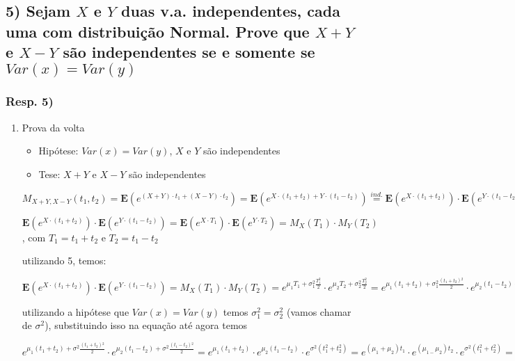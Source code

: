 \documentclass[english]{article}
\begin{document}
\subsection*{\textmd{5) Sejam $X$ e $Y$ duas v.a. independentes, cada uma com
distribuição Normal. Prove que $X+Y$ e $X-Y$ são independentes se
e somente se $Var(x)=Var(y)$}}


\subsubsection*{\textmd{Resp. 5) }}
\begin{enumerate}
\item Prova da volta

\begin{itemize}
\item Hipótese: $Var(x)=Var(y)$, $X$ e $Y$ são independentes
\item Tese: $X+Y$ e $X-Y$ são independentes
\end{itemize}

$M_{X+Y,X-Y}(t_{1},t_{2})=\mathbf{E}(e^{(X+Y)\cdot t_{1}+(X-Y)\cdot t_{2}})=\mathbf{E}(e^{X\cdot(t_{1}+t_{2})+Y\cdot(t_{1}-t_{2})})\overset{ind.}{=}\mathbf{E}(e^{X\cdot(t_{1}+t_{2})})\cdot\mathbf{E}(e^{Y\cdot(t_{1}-t_{2})})$


$\mathbf{E}(e^{X\cdot(t_{1}+t_{2})})\cdot\mathbf{E}(e^{Y\cdot(t_{1}-t_{2})})=\mathbf{E}(e^{X\cdot T_{1}})\cdot\mathbf{E}(e^{Y\cdot T_{2}})=M_{X}(T_{1})\cdot M_{Y}(T_{2})$,
com $T_{1}=t_{1}+t_{2}$ e $T_{2}=t_{1}-t_{2}$


utilizando 5, temos:


$\mathbf{E}(e^{X\cdot(t_{1}+t_{2})})\cdot\mathbf{E}(e^{Y\cdot(t_{1}-t_{2})})=M_{X}(T_{1})\cdot M_{Y}(T_{2})=e^{\mu_{1}T_{1}+\sigma_{1}^{2}\frac{T_{1}^{2}}{2}}\cdot e^{\mu_{2}T_{2}+\sigma_{2}^{2}\frac{T_{2}^{2}}{2}}=e^{\mu_{1}(t_{1}+t_{2})+\sigma_{1}^{2}\frac{(t_{1}+t_{2}){}^{2}}{2}}\cdot e^{\mu_{2}(t_{1}-t_{2})+\sigma_{2}^{2}\frac{(t_{1}-t_{2}){}^{2}}{2}}$


utilizando a hipótese que $Var(x)=Var(y)$ temos $\sigma_{1}^{2}=\sigma_{2}^{2}$
(vamos chamar de $\sigma^{2}$), substituindo isso na equação até
agora temos


$e^{\mu_{1}(t_{1}+t_{2})+\sigma^{2}\frac{(t_{1}+t_{2}){}^{2}}{2}}\cdot e^{\mu_{2}(t_{1}-t_{2})+\sigma^{2}\frac{(t_{1}-t_{2}){}^{2}}{2}}=e^{\mu_{1}(t_{1}+t_{2})}\cdot e^{\mu_{2}(t_{1}-t_{2})}\cdot e^{\sigma^{2}(t_{1}^{2}+t_{2}^{2})}=e^{(\mu_{1}+\mu_{2})t_{1}}\cdot e^{(\mu_{1-}\mu_{2})t_{2}}\cdot e^{\sigma^{2}(t_{1}^{2}+t_{2}^{2})}=$



\end{enumerate}
\end{document}

